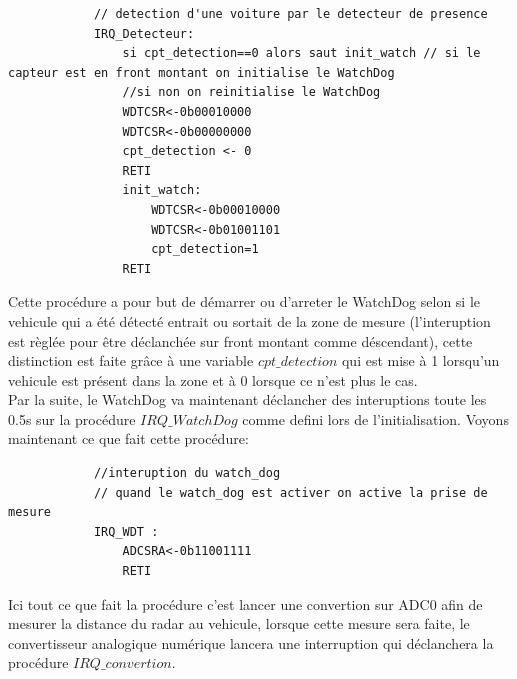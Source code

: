 \documentclass[a4paper, 12pt]{article}
\begin{document}
		\begin{lstlisting}
			// detection d'une voiture par le detecteur de presence  
			IRQ_Detecteur:
				si cpt_detection==0 alors saut init_watch // si le capteur est en front montant on initialise le WatchDog
				//si non on reinitialise le WatchDog 
				WDTCSR<-0b00010000
				WDTCSR<-0b00000000
				cpt_detection <- 0 
				RETI
				init_watch: 
					WDTCSR<-0b00010000
					WDTCSR<-0b01001101
					cpt_detection=1
				RETI
		\end{lstlisting}
		Cette procédure a pour but de démarrer ou d'arreter le WatchDog selon si le vehicule qui a été détecté entrait ou sortait de la zone de mesure (l'interuption est règlée pour être déclanchée sur front montant comme déscendant), cette distinction est faite grâce à une variable $cpt\_detection$ qui est mise à 1 lorsqu'un vehicule est présent dans la zone et à 0 lorsque ce n'est plus le cas.\\
		
		Par la suite, le WatchDog va maintenant déclancher des interuptions toute les 0.5s sur la procédure $IRQ\_WatchDog$ comme defini lors de l'initialisation. Voyons maintenant ce que fait cette procédure:\\
		
		\begin{lstlisting}
			//interuption du watch_dog
			// quand le watch_dog est activer on active la prise de mesure
			IRQ_WDT :
				ADCSRA<-0b11001111
				RETI
		\end{lstlisting}
		Ici tout ce que fait la procédure c'est lancer une convertion sur ADC0 afin de mesurer la distance du radar au vehicule, lorsque cette mesure sera faite, le convertisseur analogique numérique lancera une interruption qui déclanchera la procédure $IRQ\_convertion$.\\
\end{document}
